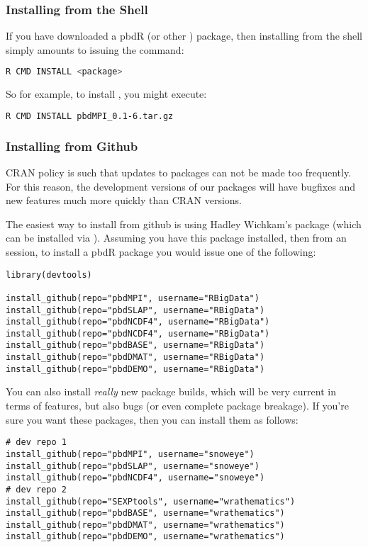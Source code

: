 \subsubsection{Installing from the Shell}
If you have downloaded a pbdR (or other ) package, then installing from the shell simply amounts to issuing the command:
\begin{lstlisting}[language=sh]
R CMD INSTALL <package>
\end{lstlisting}
So for example, to install , you might execute:
\begin{lstlisting}[language=sh]
R CMD INSTALL pbdMPI_0.1-6.tar.gz
\end{lstlisting}


\subsubsection{Installing from Github}
CRAN policy is such that updates to packages can not be made too frequently.  For this reason, the development versions of our packages will have bugfixes and new features much more quickly than CRAN versions.  

The easiest way to install from github is using Hadley Wichkam's  package (which can be installed via ).  Assuming you have this package installed, then from an  session, to install a pbdR package you would issue one of the following:

\begin{lstlisting}[language=rr]
library(devtools)

install_github(repo="pbdMPI", username="RBigData")
install_github(repo="pbdSLAP", username="RBigData")
install_github(repo="pbdNCDF4", username="RBigData")
install_github(repo="pbdNCDF4", username="RBigData")
install_github(repo="pbdBASE", username="RBigData")
install_github(repo="pbdDMAT", username="RBigData")
install_github(repo="pbdDEMO", username="RBigData")
\end{lstlisting}

You can also install \emph{really} new package builds, which will be very current in terms of features, but also bugs (or even complete package breakage).  If you're sure you want these packages, then you can install them as follows:

\begin{lstlisting}[language=rr]
# dev repo 1
install_github(repo="pbdMPI", username="snoweye")
install_github(repo="pbdSLAP", username="snoweye")
install_github(repo="pbdNCDF4", username="snoweye")
# dev repo 2
install_github(repo="SEXPtools", username="wrathematics")
install_github(repo="pbdBASE", username="wrathematics")
install_github(repo="pbdDMAT", username="wrathematics")
install_github(repo="pbdDEMO", username="wrathematics")
\end{lstlisting}
